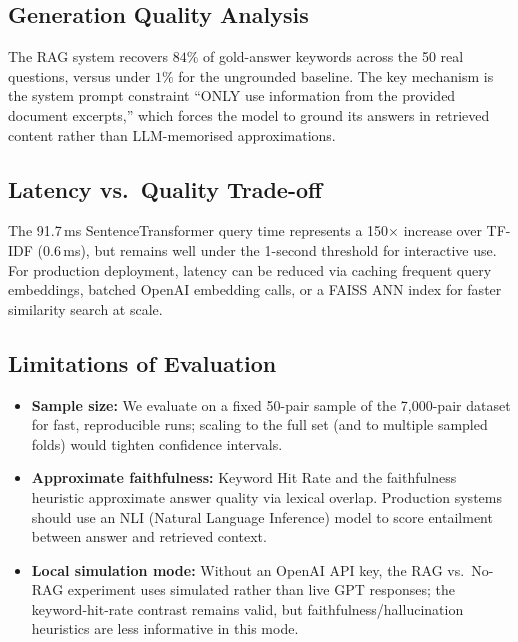 \documentclass[12pt,a4paper]{article}
\begin{document}
\subsection{Generation Quality Analysis}

The RAG system recovers $84\%$ of gold-answer keywords across the 50 real questions, versus under $1\%$ for the ungrounded baseline. The key mechanism is the system prompt constraint ``ONLY use information from the provided document excerpts,'' which forces the model to ground its answers in retrieved content rather than LLM-memorised approximations.

\subsection{Latency vs.\ Quality Trade-off}

The 91.7\,ms SentenceTransformer query time represents a 150$\times$ increase over TF-IDF (0.6\,ms), but remains well under the 1-second threshold for interactive use. For production deployment, latency can be reduced via caching frequent query embeddings, batched OpenAI embedding calls, or a FAISS ANN index for faster similarity search at scale.

\subsection{Limitations of Evaluation}

\begin{itemize}[leftmargin=*, noitemsep]
  \item \textbf{Sample size:} We evaluate on a fixed 50-pair sample of the 7{,}000-pair dataset for fast, reproducible runs; scaling to the full set (and to multiple sampled folds) would tighten confidence intervals.
  \item \textbf{Approximate faithfulness:} Keyword Hit Rate and the faithfulness heuristic approximate answer quality via lexical overlap. Production systems should use an NLI (Natural Language Inference) model to score entailment between answer and retrieved context.
  \item \textbf{Local simulation mode:} Without an OpenAI API key, the RAG vs.\ No-RAG experiment uses simulated rather than live GPT responses; the keyword-hit-rate contrast remains valid, but faithfulness/hallucination heuristics are less informative in this mode.
\end{itemize}

\end{document}
